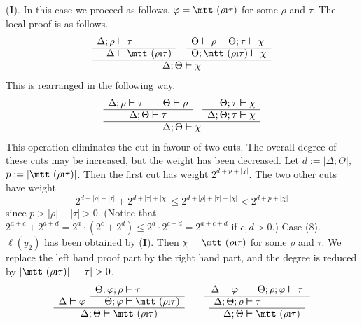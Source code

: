 ({\mtt{}}\textbf{I}). In this case we proceed as follows. 
$\varphi =\mbox{\mtt ($\rho$\symbol{25}$\tau$)}$ for some $\rho$ 
and $\tau$. The local proof is as follows.
\begin{equation}
\begin{array}{r@{\;\bvdash\;}lccc}
\Delta;\rho & \tau & &
    \Theta \bvdash \rho & \Theta;\tau\bvdash\chi
\\\cline{1-2}\cline{4-5}
\Delta & \mbox{\mtt ($\rho$\symbol{25}$\tau$)}
    & &
\multicolumn{2}{c}{\Theta;\mbox{\mtt ($\rho$\symbol{25}$\tau$)}
    \bvdash \chi} \\\hline
\multicolumn{5}{c}{\Delta;\Theta \bvdash \chi}
\end{array}
\end{equation}
This is rearranged in the following way.
\begin{equation}
\begin{array}{ccr@{\;\bvdash\;}l}
\Delta;\rho \bvdash \tau
\qquad
\Theta \bvdash  \rho & & \Theta;\tau & \chi \\\cline{1-1}\cline{3-4}
\Delta;\Theta \bvdash \tau & & \Delta;\Theta;\tau  & \chi \\\hline
\multicolumn{4}{c}{
\Delta;\Theta \bvdash \chi}
\end{array}
\end{equation}
This operation eliminates the cut in favour of two cuts. The overall
degree of these cuts may be increased, but the weight has been
decreased. Let $d := |\Delta;\Theta|$, $p := |\mbox{\mtt ($\rho$%
\symbol{25}$\tau$)}|$. Then the first cut has weight $2^{d + p + |\chi|}$.
The two other cuts have weight
\begin{equation}
2^{d + |\rho| + |\tau|} + 2^{d + |\tau| + |\chi|} \leq
2^{d + |\rho| + |\tau| + |\chi|} <
2^{d + p + |\chi|}
\end{equation}
since $p > |\rho| + |\tau| > 0$. (Notice
that $2^{a+c} + 2^{a+d} = 2^a \cdot (2^c + 2^d) \leq 2^a \cdot
2^{c+d} = 2^{a+c+d}$ if $c, d > 0$.) 
Case (8). $\ell(y_2)$ has been obtained by (\textbf{I}{\mtt{}}). 
Then $\chi = \mbox{\mtt ($\rho$\symbol{25}$\tau$)}$ for some $\rho$ 
and $\tau$. We replace the left hand proof part by the right hand part, 
and the degree is reduced by $|\mbox{\mtt ($\rho$\symbol{25}$\tau$)}| 
- |\tau| > 0$.
\begin{equation}
\begin{array}{cr@{\;\bvdash\;}l}
    & \Theta;\varphi;\rho & \tau \\\cline{2-3}
\Delta \bvdash \varphi & \Theta;\varphi & 
	\mbox{\mtt ($\rho$\symbol{25}$\tau$)} \\\hline
\multicolumn{3}{c}{\Delta;\Theta \bvdash 
	\mbox{\mtt ($\rho$\symbol{25}$\tau$)}}
\end{array}
\qquad
\begin{array}{c}
\Delta \bvdash \varphi \qquad \Theta;\rho;\varphi \bvdash \tau \\\hline
\begin{array}{r@{\;\bvdash \;}l}
\Delta;\Theta;\rho & \tau \\\hline
\Delta;\Theta & \mbox{\mtt ($\rho$\symbol{25}$\tau$)}
\end{array}
\end{array}
\end{equation}
